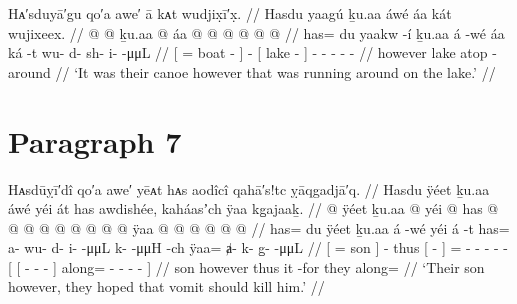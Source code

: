 \ex\label{ex:89-105-canoe-run-around}%
%
\begingl
	\glpreamble	Hᴀ′sduyā′gu qo′a awe′ ā kᴀt wudjix̣ī′x̣. //
	\glpreamble	Hasdu yaagú ḵu.aa áwé áa kát wujixeex. //
	\gla	{}  @ {}  @ {} {}
		ḵu.aa  @ {}
		{} áa  @ {} {}
		 @ {} @ {} @ {} @ {} @ {} //
	\glb	{} has= du yaakw -í {}
		ḵu.aa á -wé
		{} áa ká -t {}
		wu- d- sh- i-  -μμL //
	\glc	{}[ =  boat - {}]
		  -
		{}[ lake  - {}]
		- - - -  - //
	\gld	{}  {}  {} {}
		however  {}
		{} lake atop -around {}
		 {} {} {} {} {} //
	\glft	‘It was their canoe however that was running around on the lake.’
		//
\endgl
\xe

\clearpage
\section{Paragraph 7}\label{sec:89-para-7}

\ex\label{ex:89-106-hope-killed-by-filth}%
%
\begingl
	\glpreamble	Hᴀsdūỵī′dî qo′a awe′ yēᴀt hᴀs aodîcî qahā′s!tc ỵāqgadjā′q. //
	\glpreamble	Hasdu ÿéet ḵu.aa áwé yéi át has awdishée, kaháasʼch ÿaa kg̱ajaaḵ.  //
	\gla	{}  @ {} ÿéet {} ḵu.aa  @ {}
		yéi {}  @ {} {}
		has @  @ {} @ {} @ {} @ {} @ {} 
		{} {}  @ {} @ {} @ {} {}
			ÿaa @  @ {} @ {} @ {} @ {} @ {} {} //
	\glb	{} has= du ÿéet {} ḵu.aa á -wé
		yéi {} á -t {} has= a- wu- d- i-  -μμL
			{} {} k-  -μμH -ch {}
			ÿaa= ⱥ- k- g̱-  -μμL {} {} //
	\glc	{}[ =  son {}]   -
		thus {}[  - {}]
		= - - - -  -
		{}[ {}[ -  - - {}]
			along= - - -  - \· {}] //
	\gld	{}  {} son {} however  {}
		thus {} it -for {}
		they\•  {} {} {} {} {}
		{} {}  {} {} {} {}
			along=  {} {} {} {} {} {} //
	\glft	‘Their son however, they hoped that vomit should kill him.’
		//
\endgl
\xe

